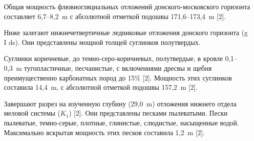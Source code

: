 Общая мощность флювиогляциальных отложений донского-московского горизонта составляет 6,7--8,2~\si{\meter} с абсолютной отметкой подошвы 171,6--173,4~\si{\meter} [2].

Ниже залегают нижнечетвертичные ледниковые отложения донского горизонта (g I ds). 
Они представлены мощной толщей суглинков полутвердых.

Суглинки коричневые, до темно-серо-коричневых, полутвердые, в кровле 0,1--0,3~\si{\meter} тугопластичные, песчанистые, с включениями дресвы и щебня преимущественно карбонатных пород до 15\% [2]. 
Мощность этих суглинков составила 14,4~\si{\meter}, с абсолютной отметкой подошвы 157,2~\si{\meter} [2].

Завершают разрез на изученную глубину (29,0~\si{\meter}) отложения нижнего отдела меловой системы ($K_1$) [2]. 
Они представлены песками пылеватыми. Пески пылеватые, темно-серые, плотные, глинистые, слюдистые, насыщенные водой. 
Максимально вскрытая мощность этих песков составила 1,2~\si{\meter} [2].
